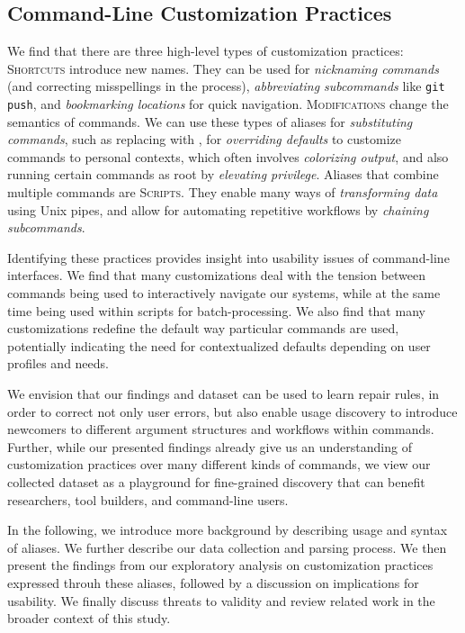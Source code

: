 \subsection{Command-Line Customization Practices} We find that there are three high-level types of customization practices:
\textsc{Shortcuts} introduce new names.
They can be used for \emph{nicknaming commands} (and correcting misspellings in the process),
\emph{abbreviating subcommands} like \texttt{git push},
and \emph{bookmarking locations} for quick navigation.
\textsc{Modifications} change the semantics of commands.
We can use these types of aliases for \emph{substituting commands}, such as replacing  with ,
for \emph{overriding defaults} to customize commands to personal contexts, 
which often involves \emph{colorizing output},
and also running certain commands as root by \emph{elevating privilege}.
Aliases that combine multiple commands are \textsc{Scripts}.
They enable many ways of \emph{transforming data} using Unix pipes, 
and allow for automating repetitive workflows by \emph{chaining subcommands}.

Identifying these practices provides insight into usability issues of command-line interfaces.
We find that many customizations deal with the tension between commands being used to interactively navigate our systems, while at the same time being used within scripts for batch-processing.
We also find that many customizations redefine the default way particular commands are used, potentially indicating the need for contextualized defaults depending on user profiles and needs. 

We envision that our findings and dataset can be used to learn repair rules, in order to correct not only user errors, but also enable usage discovery to introduce newcomers to different argument structures and workflows within commands.
Further, while our presented findings already give us an understanding of customization practices over many different kinds of commands, we view our collected dataset as a playground for fine-grained discovery that can benefit researchers, tool builders, and command-line users.


In the following, we introduce more background by describing usage and syntax of aliases. We further describe our data collection and parsing process. We then present the findings from our exploratory analysis on customization practices expressed throuh these aliases, followed by a discussion on implications for usability. We finally discuss threats to validity and review related work in the broader context of this study. 